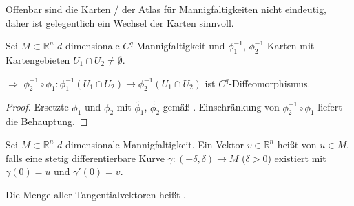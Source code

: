 \begin{underlinedenvironment}[Kartenwechsel]
	Offenbar sind die Karten / der Atlas für Mannigfaltigkeiten nicht eindeutig, daher ist gelegentlich ein Wechsel der Karten sinnvoll.
\end{underlinedenvironment}

\begin{lemma}[Kartenwechsel]
	Sei $M\subset\mathbb{R}^n$ $d$-dimensionale $C^q$-Mannigfaltigkeit und $\phi_1^{-1}$, $\phi_2^{-1}$ Karten mit Kartengebieten $U_1\cap U_2 \neq \emptyset$.\par
	\hspace*{1mm}$\Rightarrow$ $\phi_2^{-1} \circ \phi_1\colon \phi_1^{-1} (U_1\cap U_2) \to \phi_2^{-1} (U_1\cap U_2)$ ist $C^q$-Diffeomorphismus.
\end{lemma}

\begin{proof}
	Ersetzte $\phi_1$ und $\phi_2$ mit $\tilde{\phi_1}$, $\tilde{\phi_2}$ gemäß . Einschränkung von $\phi_2^{-1}\circ\phi_1$ liefert die Behauptung.
\end{proof}

\begin{*definition}
	Sei $M\subset\mathbb{R}^n$ $d$-dimensionale Mannigfaltigkeit. Ein Vektor $v\in\mathbb{R}^n$ heißt  von $u\in M$, falls eine stetig differentierbare Kurve $\gamma\colon(-\delta, \delta)\to M$ ($\delta > 0$) existiert mit $\gamma(0) = u$ und $\gamma'(0) = v$.
	
	Die Menge aller Tangentialvektoren heißt .
\end{*definition}

